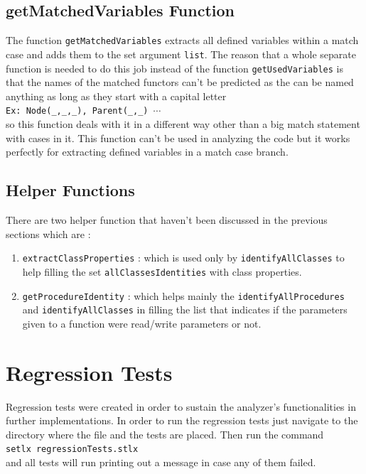 \documentclass[11pt]{report}
\begin{document}
\section{getMatchedVariables Function}

The function \texttt{getMatchedVariables} extracts all defined variables within a match case and adds them to the set argument \texttt{list}. The reason that a whole separate function is needed to do this job instead of the function \texttt{getUsedVariables} is that the names of the matched functors can't be predicted as the can be named anything as long as they start with a capital letter 
\\[0.2cm]
\hspace*{0.6cm}
\texttt{Ex: Node(\_,\_,\_), Parent(\_,\_) $\cdots$}
\\[0.2cm]

so this function deals with it in a different way other than a big match statement with cases in it. This function can't be used in analyzing the code but it works perfectly for extracting defined variables in a match case branch.

\section{Helper Functions}
There are two helper function that haven't been discussed in the previous sections which are :

\begin{enumerate}
\item \texttt{extractClassProperties} : which is used only by \texttt{identifyAllClasses} to help filling the set \texttt{allClassesIdentities} with class properties.

\item \texttt{getProcedureIdentity} : which helps mainly the \texttt{identifyAllProcedures} and \texttt{identifyAllClasses} in filling the list that indicates if the parameters given to a function were read/write parameters or not.
\end{enumerate}



\chapter{Regression Tests}

Regression tests were created in order to sustain the analyzer's functionalities in further implementations. In order to run the regression tests just navigate to the directory where the file and the tests are placed. Then run the command
\\[0.2cm]
\hspace*{0.6cm}
\texttt{setlx regressionTests.stlx}
\\[0.2cm]
and all tests will run printing out a message in case any of them failed.
\\
\end{document}
